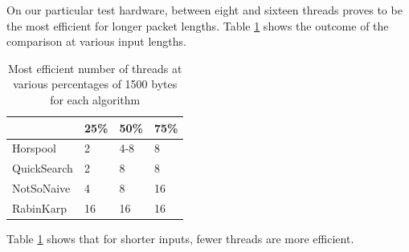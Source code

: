 \documentclass[11pt]{article}
\begin{document}
On our particular test hardware, between eight and sixteen threads proves to be the most efficient for longer packet lengths. Table \ref{table-threadcompare} shows the outcome of the comparison at various input lengths.


\begin{table}[!htb]
\centering
\begin{tabular}{@{}llll@{}}
\toprule
 & 25\% & 50\% & 75\% \\ \midrule
Horspool & 2 & 4-8 & 8 \\
QuickSearch & 2 & 8 & 8 \\
NotSoNaive & 4 & 8 & 16 \\
RabinKarp & 16 & 16 & 16 \\ \bottomrule
\end{tabular}
\caption{Most efficient number of threads at various percentages of 1500 bytes for each algorithm}
\label{table-threadcompare}
\end{table}

Table \ref{table-threadcompare} shows that for shorter inputs, fewer threads are more efficient.



\end{document}
